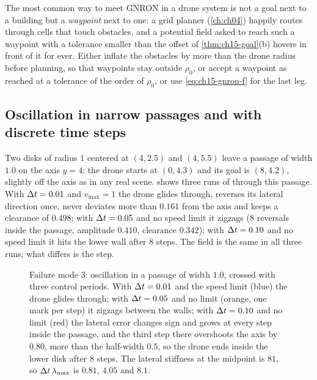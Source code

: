 \begin{pitfall}
The most common way to meet GNRON in a drone system is not a goal next to a
building but a \emph{waypoint} next to one: a grid planner (\cref{ch:ch04})
happily routes through cells that touch obstacles, and a potential field
asked to reach such a waypoint with a tolerance smaller than the offset of
\cref{thm:ch15-goal}(b) hovers in front of it for ever. Either inflate the obstacles by more than the drone
radius before planning, so that waypoints stay outside $\rho_0$, or accept a
waypoint as reached at a tolerance of the order of $\rho_0$, or use
\cref{eq:ch15-gnron-f} for the last leg.
\end{pitfall}

\subsection{Oscillation in narrow passages and with discrete time steps}
\label{sec:ch15-oscillation}

Two disks of radius $1$ centered at $(4, 2.5)$ and $(4, 5.5)$ leave a passage
of width $1.0$ on the axis $y = 4$; the drone starts at $(0, 4.3)$ and its
goal is $(8, 4.2)$, slightly off the axis as in any real scene.
 shows three runs of 
through this passage. With $\Delta t = 0.01$ and $v_{\max} = 1$ the drone glides
through, reverses its lateral direction once, never deviates more than
$0.161$ from the axis and keeps a clearance of $0.498$; with $\Delta t = 0.05$ and
no speed limit it zigzags ($8$ reversals inside the passage, amplitude
$0.410$, clearance $0.342$); with $\Delta t = 0.10$ and no speed limit it hits
the lower wall after $8$ steps. The field is the
same in all three runs; what differs is the step.

\begin{figure}[tb]
  \centering
  \caption{Failure mode 3: oscillation in a passage of width $1.0$, crossed
  with three control periods. With $\Delta t = 0.01$ and the speed limit (blue)
  the drone glides through; with $\Delta t = 0.05$ and no limit (orange, one mark
  per step) it zigzags between the walls; with $\Delta t = 0.10$ and no limit
  (red) the lateral error changes sign and grows at every step inside the
  passage, and the third step there overshoots the axis by $0.80$, more than
  the half-width $0.5$, so the drone ends inside the lower disk after $8$
  steps. The lateral stiffness at the midpoint
  is $81$, so $\Delta t\,\lambda_{\max}$ is $0.81$, $4.05$ and $8.1$.}
  \label{fig:ch15-oscillation}
\end{figure}

